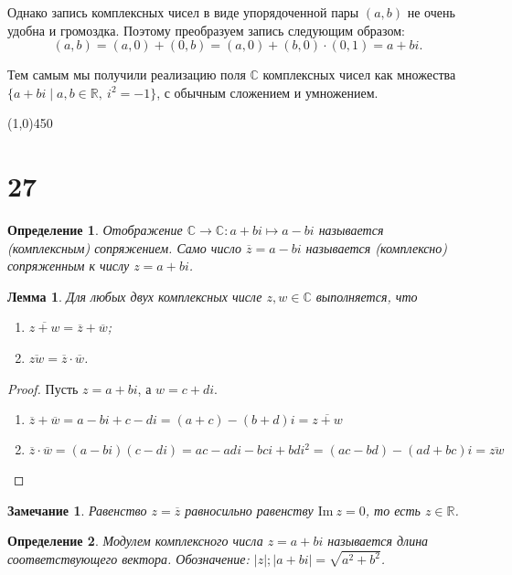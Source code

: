 \documentclass[a4paper,12pt]{article}
\renewcommand{\Im}{\mathrm{Im\:}}
\newtheorem*{Def}{Определение}
\newtheorem*{Lemma}{Лемма}
\newtheorem*{Note}{Замечание}
\begin{document}
	Однако запись комплексных чисел в виде упорядоченной пары $(a, b)$ не очень удобна и громоздка. Поэтому преобразуем запись следующим образом:
	\[
	(a, b) = (a, 0) + (0, b) = (a, 0) + (b, 0) \cdot (0, 1) = a + bi.
	\]
	
	Тем самым мы получили реализацию поля $\mathbb{C}$ комплексных чисел как множества \\ $\{a + bi \mid a, b \in \mathbb{R},\ i^2 = -1\}$, с обычным сложением и умножением.
	
	\begin{center}
		\line(1,0){450}
	\end{center}
	\section*{27}
	\begin{Def}
		Отображение $\mathbb{C} \rightarrow \mathbb{C} : a + bi \mapsto a - bi$ называется (комплексным) сопряжением. Само число $\overline{z} = a - bi$ называется (комплексно) сопряженным к числу $z = a + bi$. 
	\end{Def}
	
	\begin{Lemma}
		Для любых двух комплексных числе $z, w \in \mathbb{C}$ выполняется, что
		\begin{enumerate}
			\item $\overline{z + w} = \overline{z} + \overline{w}$;
			\item $\overline{zw} = \overline{z} \cdot \overline{w}$.
		\end{enumerate}
	\end{Lemma}
	
	\begin{proof}
		Пусть $z = a + bi$, а $w = c + di$. 
		\begin{enumerate}
			\item $\overline{z} + \overline{w} = a - bi + c - di = (a + c) - (b + d)i = \overline{z+ w}$
			\item $\overline{z} \cdot \overline{w} = (a - bi)(c - di) = ac - adi - bci + bdi^2 = (ac - bd) - (ad + bc)i = \overline{zw}$
		\end{enumerate}
	\end{proof}
	
	\begin{Note}
		Равенство $z = \overline{z}$ равносильно равенству $\Im z = 0$, то есть $z \in \mathbb{R}$.
	\end{Note}
	\begin{Def}
		Модулем комплексного числа $z = a + bi$ называется длина соответствующего вектора. Обозначение: $|z|; |a+bi| = \sqrt{a^2 + b^2}$.
	\end{Def}
	
\end{document}

